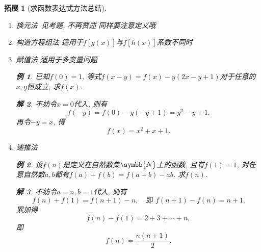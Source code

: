 \documentclass[a4paper, 12pt]{ctexart}
\theoremstyle{plain}
\theoremstyle{nonumberplain}
\newtheorem{solution}{解}
\theoremstyle{nonumberplain}
\newtheorem{supplement}{拓展}
\theoremstyle{nonumberplain}
\newtheorem{example}{例}
\newcommand{\BN}{\symbb{N}}
\begin{document}
\begin{supplement}[求函数表达式方法总结]
\begin{enumerate}[1.]
\begin{solution}
\begin{equation}
                \end{equation}
                令$t=x+x^{-1}$, 则$t\in(-\infty, -2]\cup[2, \infty)$, 故
                \begin{equation}
                    f(x)=\frac{1}{x^2-2}, \quad x\geq 2 \text{ or } x\leq -2.
                \end{equation}
            \end{solution}
            \item 换元法\ 见考题, 不再赘述 \emph{同样要注意定义哦}
            \item 构造方程组法 \emph{适用于$f[g(x)]$与$f[h(x)]$系数不同时}
            \item 赋值法 \emph{适用于多变量问题}
            \begin{example}
                已知$f(0)=1$, 等式$f(x-y)=f(x)-y(2x-y+1)$对于任意的$x, y$恒成立, 求$f(x)$.
            \end{example}
            \begin{solution}
                不妨令$x=0$代入, 则有%
                \begin{equation}
                    f(-y)=f(0)-y(-y+1)=y^2-y+1.
                \end{equation}
                再令$-y=x$, 得
                \begin{equation}
                    f(x)=x^2+x+1.
                \end{equation}
            \end{solution}
            \item 递推法
            \begin{example}
                设$f(n)$是定义在自然数集$\BN$上的函数, 且有$f(1)=1$, 对任意自然数$a, b$都有$f(a)+f(b)=f(a+b)-ab$. 求$f(n)$.
            \end{example}
            \begin{solution}
                不妨令$a=n, b=1$代入, 则有%
                \begin{equation}
                    f(n)+f(1)=f(n+1)-n,\quad\text{即 }f(n+1)-f(n)=n+1.
                \end{equation}
                累加得
                \begin{equation}
                    f(n)-f(1)=2+3+\dotsb +n,
                \end{equation}
                即
                \begin{equation}
                    f(n)=\frac{n(n+1)}{2}.
                \end{equation}
            \end{solution}
        \end{enumerate}
    \end{supplement}
\end{document}
